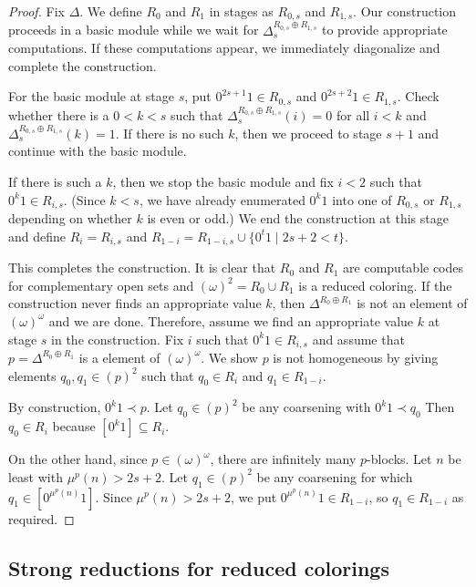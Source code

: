 \documentclass{amsart}
\theoremstyle{definition}
\theoremstyle{remark}
\begin{document}
\begin{proof}
Fix $\Delta$. We define $R_0$ and $R_1$ in stages as $R_{0,s}$ and
$R_{1,s}$.  Our construction proceeds in a basic module while we wait
for $\Delta_s^{R_{0,s} \oplus R_{1,s}}$ to provide appropriate
computations. If these computations appear, we immediately
diagonalize and complete the construction.

For the basic module at stage $s$, put
$0^{2s+1}1 \in R_{0,s}$ and $0^{2s+2}1 \in R_{1,s}$.
Check whether there is a $0 < k < s$ such that $\Delta_{s}^{R_{0,s}
  \oplus R_{1,s}}(i) = 0$ for all $i < k$ and $\Delta_{s}^{R_{0,s}
  \oplus R_{1,s}}(k) = 1$. If there is no such $k$, then we proceed to
stage $s+1$ and continue with the basic module.

If there is such a $k$, then we stop the basic module and fix $i < 2$
such that $0^k1 \in R_{i,s}$. (Since $k < s$, we have already
enumerated $0^k1$ into one of $R_{0,s}$ or $R_{1,s}$ depending on
whether $k$ is even or odd.) We end the construction at this stage and define $R_i =
R_{i,s}$ and $R_{1-i} = R_{1-i,s} \cup \{ 0^t1 \mid 2s+2 < t \}$.

This completes the construction. It is clear that $R_0$ and $R_1$ are computable codes
for complementary open sets and $(\omega)^2 = R_0 \cup R_1$ is a reduced coloring. If the
construction never finds an appropriate value $k$, then $\Delta^{R_0 \oplus
  R_1}$ is not an element of $(\omega)^\omega$ and we are
done. Therefore, assume we find an appropriate value $k$ at stage
$s$ in the construction.  Fix $i$ such that $0^k1 \in R_{i,s}$ and
assume that $p = \Delta^{R_0 \oplus R_1}$ is a element of
$(\omega)^\omega$. We show $p$ is not homogeneous by giving elements $q_0, q_1 \in (p)^2$ such that
$q_0 \in R_i$ and $q_1 \in R_{1-i}$.

By construction, $0^k 1 \prec p$. Let $q_0
  \in (p)^2$ be any coarsening with $0^k1 \prec q_0$
  Then $q_0 \in R_i$ because $[0^k1] \subseteq R_i$.

On the other hand, since $p \in (\omega)^{\omega}$, there are
infinitely many $p$-blocks. Let $n$ be least with $\mu^p(n) > 2s+2$. Let $q_1 \in (p)^2$ be any coarsening for which 
$q_1 \in [0^{\mu^p(n)}1]$. Since $\mu^p(n) > 2s+2$, we put $0^{\mu^p(n)}1 \in R_{1-i}$, so $q_1 \in R_{1-i}$ 
as required. 
\end{proof}


\subsection{Strong reductions for reduced colorings}\label{sec:weihrauch}
\end{document}
